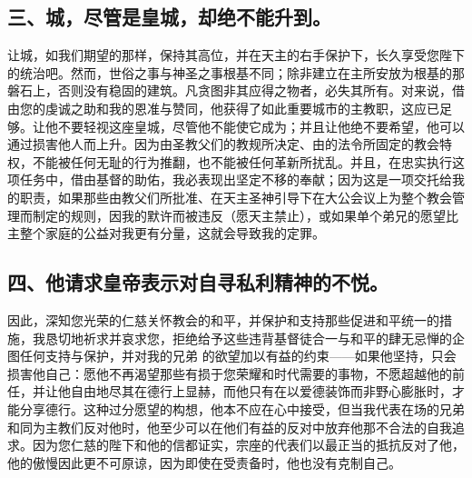 
\subsection{三、城，尽管是皇城，却绝不能升到。}

让城，如我们期望的那样，保持其高位，并在天主的右手保护下，长久享受您陛下的统治吧。然而，世俗之事与神圣之事根基不同；除非建立在主所安放为根基的那磐石上，否则没有稳固的建筑。凡贪图非其应得之物者，必失其所有。对来说，借由您的虔诚之助和我的恩准与赞同，他获得了如此重要城市的主教职，这应已足够。让他不要轻视这座皇城，尽管他不能使它成为；并且让他绝不要希望，他可以通过损害他人而上升。因为由圣教父们的教规所决定、由的法令所固定的教会特权，不能被任何无耻的行为推翻，也不能被任何革新所扰乱。并且，在忠实执行这项任务中，借由基督的助佑，我必表现出坚定不移的奉献；因为这是一项交托给我的职责，如果那些由教父们所批准、在天主圣神引导下在大公会议上为整个教会管理而制定的规则，因我的默许而被违反（愿天主禁止），或如果单个弟兄的愿望比主整个家庭的公益对我更有分量，这就会导致我的定罪。\par


\subsection{四、他请求皇帝表示对自寻私利精神的不悦。}

因此，深知您光荣的仁慈关怀教会的和平，并保护和支持那些促进和平统一的措施，我恳切地祈求并哀求您，拒绝给予这些违背基督徒合一与和平的肆无忌惮的企图任何支持与保护，并对我的兄弟  的欲望加以有益的约束——如果他坚持，只会损害他自己：愿他不再渴望那些有损于您荣耀和时代需要的事物，不愿超越他的前任，并让他自由地尽其在德行上显赫，而他只有在以爱德装饰而非野心膨胀时，才能分享德行。这种过分愿望的构想，他本不应在心中接受，但当我代表在场的兄弟和同为主教们反对他时，他至少可以在他们有益的反对中放弃他那不合法的自我追求。因为您仁慈的陛下和他的信都证实，宗座的代表们以最正当的抵抗反对了他，他的傲慢因此更不可原谅，因为即使在受责备时，他也没有克制自己。\par


